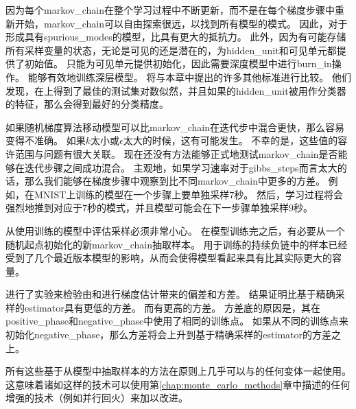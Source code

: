 因为每个\gls{markov_chain}在整个学习过程中不断更新，而不是在每个梯度步骤中重新开始，\gls{markov_chain}可以自由探索很远，以找到所有模型的模式。
因此，对于形成具有\gls{spurious_modes}的模型，比具有更大的抵抗力。
此外，因为有可能存储所有采样变量的状态，无论是可见的还是潜在的，为\gls{hidden_unit}和可见单元都提供了初始值。
只能为可见单元提供初始化，因此需要深度模型中进行\gls{burn_in}操作。
能够有效地训练深层模型。
\cite{Marlin10Inductive-small}将与本章中提出的许多其他标准进行比较。
他们发现，在上得到了最佳的测试集对数似然，并且如果的\gls{hidden_unit}被用作分类器的特征，那么会得到最好的分类精度。


如果随机梯度算法移动模型可以比\gls{markov_chain}在迭代步中混合更快，那么容易变得不准确。
如果$k$太小或$\epsilon$太大的时候，这有可能发生。
不幸的是，这些值的容许范围与问题有很大关联。
现在还没有方法能够正式地测试\gls{markov_chain}是否能够在迭代步骤之间成功混合。
主观地，如果学习速率对于\gls{gibbs_steps}而言太大的话，那么我们能够在梯度步骤中观察到比不同\gls{markov_chain}中更多的方差。
例如，在MNIST上训练的模型在一个步骤上要单独采样$7$秒。 
然后，学习过程将会强烈地推到对应于$7$秒的模式，并且模型可能会在下一步骤单独采样$9$秒。


从使用训练的模型中评估采样必须非常小心。
在模型训练完之后，有必要从一个随机起点初始化的新\gls{markov_chain}抽取样本。
用于训练的持续负链中的样本已经受到了几个最近版本模型的影响，从而会使得模型看起来具有比其实际更大的容量。



\cite{BerglundR13}进行了实验来检验由和进行梯度估计带来的偏差和方差。
结果证明比基于精确采样的\gls{estimator}具有更低的方差。
而有更高的方差。
方差底的原因是，其在\gls{positive_phase}和\gls{negative_phase}中使用了相同的训练点。
如果从不同的训练点来初始化\gls{negative_phase}，那么方差将会上升到基于精确采样的\gls{estimator}的方差之上。


所有这些基于从模型中抽取样本的方法在原则上几乎可以与的任何变体一起使用。
这意味着诸如这样的技术可以使用第\ref{chap:monte_carlo_methods}章中描述的任何增强的技术（例如并行回火）来加以改进\citep{desjardins2010tempered,Cho10IJCNN-small}。


